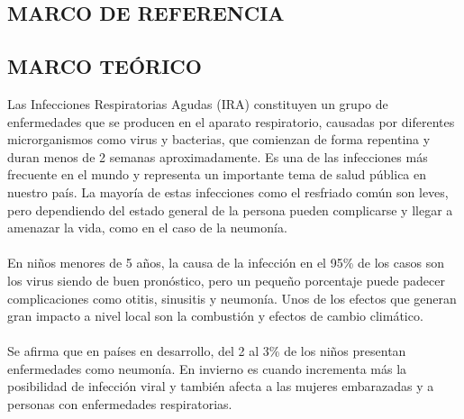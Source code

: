 \documentclass[a4paper,openright,12pt]{book}
\theoremstyle{definition}
\theoremstyle{remark}
\begin{document}
\begin{center}
 \chapter{MARCO DE REFERENCIA}\label{cap.referencia}
\end{center}

\section{MARCO TEÓRICO}
Las Infecciones Respiratorias Agudas (IRA) constituyen un grupo de enfermedades que se producen en el aparato respiratorio, causadas por diferentes microrganismos como virus y bacterias, que comienzan de forma repentina y duran menos de 2 semanas aproximadamente. Es una de las infecciones más frecuente en el mundo y representa un importante tema de salud pública en nuestro país.  La mayoría de estas infecciones como el resfriado común son leves, pero dependiendo del estado general de la persona pueden complicarse y llegar a amenazar la vida, como en el caso de la neumonía.\\\\
En niños menores de 5 años, la causa de la infección en el  95\% de los casos son los virus siendo de buen pronóstico, pero un pequeño porcentaje puede padecer complicaciones como  otitis, sinusitis y neumonía. Unos de los efectos que generan gran impacto a nivel local son  la combustión y efectos de cambio climático.\\\\
Se afirma que en países en desarrollo, del 2 al 3\% de los niños presentan enfermedades como neumonía. En invierno es cuando incrementa más la posibilidad de infección viral y también afecta a las mujeres embarazadas y a personas con enfermedades respiratorias.\\\\
\end{document}

